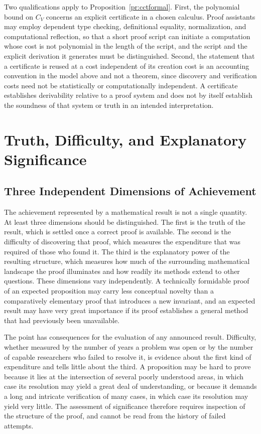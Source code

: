 \documentclass[11pt,letterpaper]{report}
\theoremstyle{plain}
\theoremstyle{definition}
\theoremstyle{remark}
\begin{document}
Two qualifications apply to Proposition~\ref{pr:cctformal}. First, the polynomial bound on $C_V$ concerns an explicit certificate in a chosen calculus. Proof assistants may employ dependent type checking, definitional equality, normalization, and computational reflection, so that a short proof script can initiate a computation whose cost is not polynomial in the length of the script, and the script and the explicit derivation it generates must be distinguished. Second, the statement that a certificate is reused at a cost independent of its creation cost is an accounting convention in the model above and not a theorem, since discovery and verification costs need not be statistically or computationally independent. A certificate establishes derivability relative to a proof system and does not by itself establish the soundness of that system or truth in an intended interpretation.

\chapter{Truth, Difficulty, and Explanatory Significance}

\section{Three Independent Dimensions of Achievement}

The achievement represented by a mathematical result is not a single quantity. At least three dimensions should be distinguished. The first is the truth of the result, which is settled once a correct proof is available. The second is the difficulty of discovering that proof, which measures the expenditure that was required of those who found it. The third is the explanatory power of the resulting structure, which measures how much of the surrounding mathematical landscape the proof illuminates and how readily its methods extend to other questions. These dimensions vary independently. A technically formidable proof of an expected proposition may carry less conceptual novelty than a comparatively elementary proof that introduces a new invariant, and an expected result may have very great importance if its proof establishes a general method that had previously been unavailable.

The point has consequences for the evaluation of any announced result. Difficulty, whether measured by the number of years a problem was open or by the number of capable researchers who failed to resolve it, is evidence about the first kind of expenditure and tells little about the third. A proposition may be hard to prove because it lies at the intersection of several poorly understood areas, in which case its resolution may yield a great deal of understanding, or because it demands a long and intricate verification of many cases, in which case its resolution may yield very little. The assessment of significance therefore requires inspection of the structure of the proof, and cannot be read from the history of failed attempts.
\end{document}
